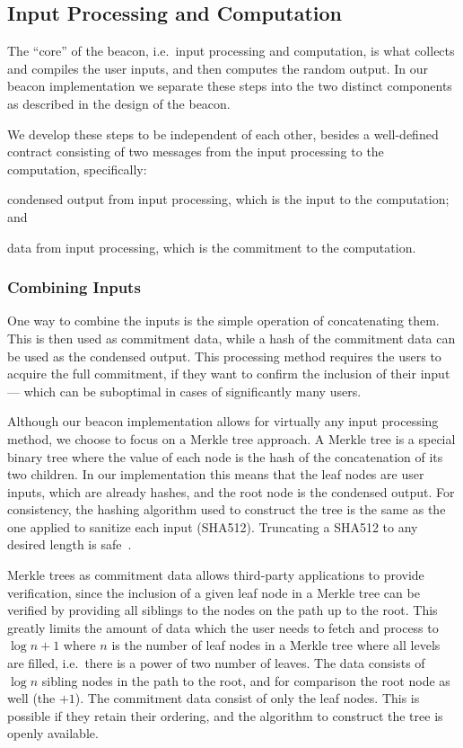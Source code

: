 \subsection{Input Processing and Computation}%
\label{sub:input_processing_and_computation}
The \enquote{core} of the beacon, i.e.\ input processing and computation, is what collects and compiles the user inputs, and then computes the random output.
In our beacon implementation we separate these steps into the two distinct components as described in the design of the beacon.

We develop these steps to be independent of each other, besides a well-defined contract consisting of two messages from the input processing to the computation, specifically:
\begin{eletterate*}
\item condensed output from input processing, which is the input to the computation; and
\item data from input processing, which is the commitment to the computation.
\end{eletterate*}

\subsubsection{Combining Inputs}%
\label{ssub:combining_inputs}
One way to combine the inputs is the simple operation of concatenating them.
This is then used as commitment data, while a hash of the commitment data can be used as the condensed output.
This processing method requires the users to acquire the full commitment, if they want to confirm the inclusion of their input --- which can be suboptimal in cases of significantly many users.

Although our beacon implementation allows for virtually any input processing method, we choose to focus on a Merkle tree approach.
A Merkle tree is a special binary tree where the value of each node is the hash of the concatenation of its two children.
In our implementation this means that the leaf nodes are user inputs, which are already hashes, and the root node is the condensed output.
For consistency, the hashing algorithm used to construct the tree is the same as the one applied to sanitize each input (SHA512).
Truncating a SHA512 to any desired length is safe~\cite{sha512faster}.

Merkle trees as commitment data allows third-party applications to provide verification, since the inclusion of a given leaf node in a Merkle tree can be verified by providing all siblings to the nodes on the path up to the root.
This greatly limits the amount of data which the user needs to fetch and process to $\log{n} + 1$ where $n$ is the number of leaf nodes in a Merkle tree where all levels are filled, i.e.\ there is a power of two number of leaves.
The data consists of $\log{n}$ sibling nodes in the path to the root, and for comparison the root node as well (the $+1$).
The commitment data consist of only the leaf nodes.
This is possible if they retain their ordering, and the algorithm to construct the tree is openly available.

